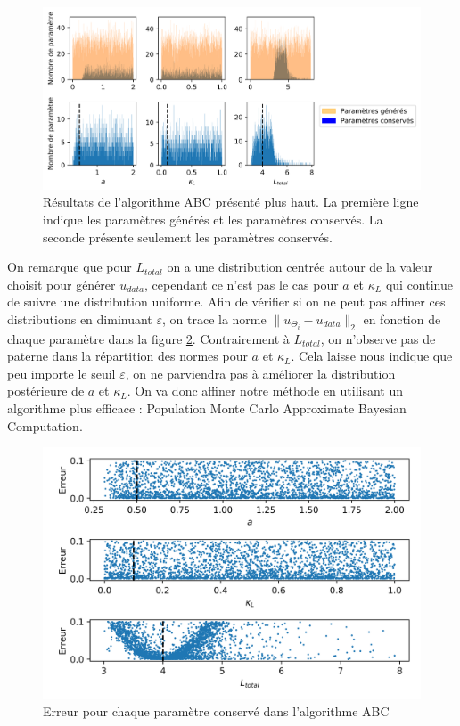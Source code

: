 \documentclass[a4paper,fleqn,leqno]{article}
\begin{document}
\begin{figure}[H]
\centering
\includegraphics[scale=0.8]{abc_distrib}
\centering
\caption{Résultats de l'algorithme ABC présenté plus haut. La première ligne indique les paramètres générés et les paramètres conservés. La seconde présente seulement les paramètres conservés.}
\label{figure:5}
\end{figure}

On remarque que pour $L_{total}$ on a une distribution centrée autour de la valeur choisit pour générer $u_{data}$, cependant ce n'est pas le cas pour $a$ et $\kappa_L$ qui continue de suivre une distribution uniforme. Afin de vérifier si on ne peut pas affiner ces distributions en diminuant $\varepsilon$, on trace la norme $\lVert u_{\Theta_i} - u_{data}\rVert_2$ en fonction de chaque paramètre dans la figure \ref{figure:6}. Contrairement à $L_{total}$, on n'observe pas de paterne dans la répartition des normes pour $a$ et $\kappa_L$. Cela laisse nous indique que peu importe le seuil $\varepsilon$, on ne parviendra pas à améliorer la distribution postérieure de $a$ et $\kappa_L$. On va donc affiner notre méthode en utilisant un algorithme plus efficace : Population Monte Carlo Approximate Bayesian Computation.

\begin{figure}[H]
\centering
\includegraphics[scale=1]{abc_error}
\centering
\caption{Erreur pour chaque paramètre conservé dans l'algorithme ABC}
\label{figure:6}
\end{figure}
\end{document}
